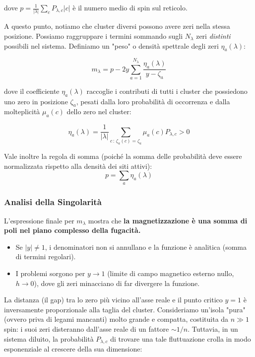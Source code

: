 dove $p=\frac{1}{|\lambda|} \sum_{c} P_{\lambda,c} |c|$ è il numero medio di spin sul reticolo.

\noindent A questo punto, notiamo che cluster diversi possono avere zeri nella stessa posizione. Possiamo raggruppare i termini sommando sugli $N_{\lambda}$ zeri \textit{distinti} possibili nel sistema. Definiamo un "peso" o densità spettrale degli zeri $\eta_a(\lambda)$:

\begin{equation}
m_{\lambda} = p - 2y \sum_{a=1}^{N_{\lambda}} \frac{\eta_a(\lambda)}{y - \zeta_a}
\end{equation}

\noindent dove il coefficiente $\eta_a(\lambda)$ raccoglie i contributi di tutti i cluster che possiedono uno zero in posizione $\zeta_a$, pesati dalla loro probabilità di occorrenza e dalla molteplicità $\mu_a(c)$ dello zero nel cluster:

\begin{equation}
\eta_a(\lambda) = \frac{1}{|\lambda|} \sum_{c \, :\, \zeta_a(c) = \zeta_a} \mu_a(c) P_{\lambda,c} > 0
\end{equation}

\noindent Vale inoltre la regola di somma (poiché la somma delle probabilità deve essere normalizzata rispetto alla densità dei siti attivi):
\begin{equation}
p = \sum_a \eta_a(\lambda)
\end{equation}

\subsubsection*{Analisi della Singolarità}

L'espressione finale per $m_{\lambda}$ mostra che \textbf{la magnetizzazione è una somma di poli nel piano complesso della fugacità.}
\begin{itemize}
    \item Se $|y| \neq 1$, i denominatori non si annullano e la funzione è analitica (somma di termini regolari).
    \item I problemi sorgono per $y \to 1$ (limite di campo magnetico esterno nullo, $h \to 0$), dove gli zeri minacciano di far divergere la funzione.
\end{itemize}

\noindent La distanza (il gap) tra lo zero più vicino all'asse reale e il punto critico $y=1$ è inversamente proporzionale alla taglia del cluster. Consideriamo un'isola "pura" (ovvero priva di legami mancanti) molto grande e compatta, costituita da $n \gg 1$ spin: i suoi zeri disteranno dall'asse reale di un fattore $\sim 1/n$. Tuttavia, in un sistema diluito, la probabilità $P_{\lambda,c}$ di trovare una tale fluttuazione crolla in modo esponenziale al crescere della sua dimensione:


